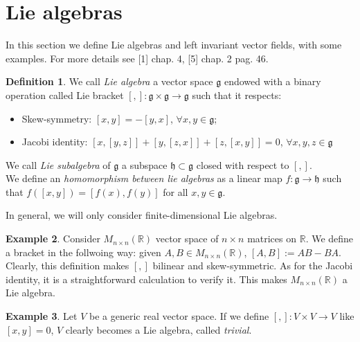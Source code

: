 \documentclass[12pt,a4paper]{report}
\theoremstyle{definition}
\newtheorem{Def}{Definition}[chapter]
\theoremstyle{Theorem}
\theoremstyle{definition}
\newtheorem{Ex}[Def]{Example}
\theoremstyle{definition}
\begin{document}
	\section{Lie algebras}
	In this section we define Lie algebras and left invariant vector fields, with some examples. For more details see [1] chap. 4, [5] chap. 2 pag. 46.
	\begin{Def}
		We call \textit{Lie algebra} a vector space $\mathfrak{g}$ endowed with a binary operation called Lie bracket $[,]:\mathfrak{g}\times\mathfrak{g}\rightarrow\mathfrak{g}$ such that it respects:
		\begin{itemize}
			\item Skew-symmetry: $[x,y]=-[y,x]$, $\forall x,y\in\mathfrak{g}$;
			\item Jacobi identity: $[x,[y,z]]+[y,[z,x]]+[z,[x,y]]=0$, $\forall x,y,z\in \mathfrak{g}$ 
		\end{itemize}
		We call \textit{Lie subalgebra} of $\mathfrak{g}$ a subspace $\mathfrak{h}\subset\mathfrak{g}$ closed with respect to $[,]$.\\
		We define an \textit{homomorphism between lie algebras} as a linear map $f:\mathfrak{g}\rightarrow\mathfrak{h}$ such that $f([x,y])=[f(x),f(y)]$ for all $x,y\in\mathfrak{g}$.
	\end{Def}
	In general, we will only consider finite-dimensional Lie algebras.
	\begin{Ex} \label{Obs: bracket Mnn}
		Consider $M_{n\times n}(\mathbb{R})$ vector space of $n\times n$ matrices on $\mathbb{R}$. We define a bracket in the follwoing way: given $A,B\in M_{n\times n}(\mathbb{R})$, $[A,B]:= AB-BA$. Clearly, this definition makes $[,]$ bilinear and skew-symmetric. As for the Jacobi identity, it is a straightforward calculation to verify it. This makes $M_{n\times n}(\mathbb{R})$ a Lie algebra. 
	\end{Ex}
	\begin{Ex}
		Let $V$ be a generic real vector space. If we define $[,]:V\times V\rightarrow V$ like $[x,y]=0$, $V$ clearly becomes a Lie algebra, called \textit{trivial}.
	\end{Ex}
\end{document}
